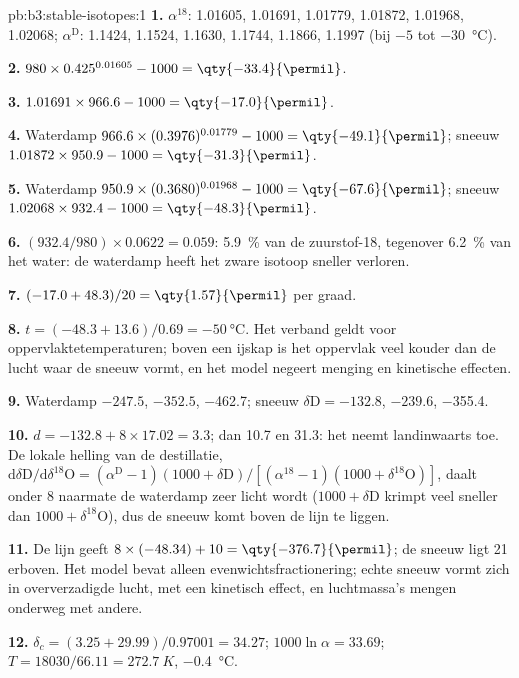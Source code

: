 \begin{solution}{pb:b3:stable-isotopes:1}
\textbf{1.} $\alpha^{18}$: 1.01605, 1.01691, 1.01779, 1.01872, 1.01968,
1.02068; $\alpha^{\mathrm D}$: 1.1424, 1.1524, 1.1630, 1.1744, 1.1866, 1.1997
(bij $-5$ tot \qty{-30}{\celsius}).

\textbf{2.} $980\times0.425^{0.01605} - 1000 = \qty{-33.4}{\permil}$.

\textbf{3.} $1.01691\times966.6 - 1000 = \qty{-17.0}{\permil}$.

\textbf{4.} Waterdamp $966.6\times(0.3976)^{0.01779} - 1000 = \qty{-49.1}{\permil}$;
sneeuw $1.01872\times950.9 - 1000 = \qty{-31.3}{\permil}$.

\textbf{5.} Waterdamp $950.9\times(0.3680)^{0.01968} - 1000 = \qty{-67.6}{\permil}$;
sneeuw $1.02068\times932.4 - 1000 = \qty{-48.3}{\permil}$.

\textbf{6.} $(932.4/980)\times0.0622 = 0.059$: \qty{5.9}{\percent} van de
zuurstof-18, tegenover \qty{6.2}{\percent} van het water: de waterdamp heeft het
zware isotoop sneller verloren.

\textbf{7.} $(-17.0 + 48.3)/20 = \qty{1.57}{\permil}$ per graad.

\textbf{8.} $t = (-48.3 + 13.6)/0.69 = \qty{-50}{\celsius}$. Het verband geldt
voor oppervlaktetemperaturen; boven een ijskap is het oppervlak veel kouder dan de
lucht waar de sneeuw vormt, en het model negeert menging en kinetische effecten.

\textbf{9.} Waterdamp $-247.5$, $-352.5$, \qty{-462.7}{\permil}; sneeuw $\delta\mathrm D
= -132.8$, $-239.6$, \qty{-355.4}{\permil}.

\textbf{10.} $d = -132.8 + 8\times17.02 = 3.3$; dan 10.7 en
\qty{31.3}{\permil}: het  neemt landinwaarts toe. De lokale helling van de
destillatie, $\mathrm d\delta\mathrm D/\mathrm d\delta^{18}\mathrm O = (\alpha^{\mathrm D} -
1)(1000 + \delta\mathrm D)/[(\alpha^{18} - 1)(1000 + \delta^{18}\mathrm O)]$, daalt onder
8 naarmate de waterdamp zeer licht wordt ($1000 + \delta\mathrm D$ krimpt veel sneller dan
$1000 + \delta^{18}\mathrm O$), dus de sneeuw komt boven de lijn te liggen.

\textbf{11.} De lijn geeft $8\times(-48.34) + 10 = \qty{-376.7}{\permil}$; de
sneeuw ligt \qty{21}{\permil} erboven. Het model bevat alleen
evenwichtsfractionering; echte sneeuw vormt zich in oververzadigde lucht, met een kinetisch effect,
en luchtmassa's mengen onderweg met andere.

\textbf{12.} $\delta_c = (3.25 + 29.99)/0.97001 = 34.27$; $1000\ln\alpha =
33.69$; $T = 18030/66.11 = \qty{272.7}{K}$, \qty{-0.4}{\celsius}.


\end{solution}

